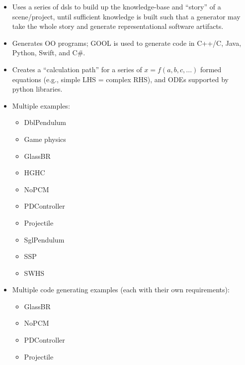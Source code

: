 \begin{itemize}
    \item Uses a series of \acfp{dsl} to build up the knowledge-base and
          ``story'' of a scene/project, until sufficient knowledge is built such that
          a generator may take the whole story and generate representational software
          artifacts.
    \item Generates OO programs; GOOL is used to generate code in C++/C, Java,
          Python, Swift, and C\#.
    \item Creates a ``calculation path'' for a series of $x = f(a,b,c,...)$
          formed equations (e.g., simple LHS = complex RHS), and ODEs supported
          by python libraries.
    \item Multiple examples:
          \begin{itemize}
              \item DblPendulum
              \item Game physics
              \item GlassBR
              \item HGHC
              \item NoPCM
              \item PDController
              \item Projectile
              \item SglPendulum
              \item SSP
              \item SWHS
          \end{itemize}
    \item Multiple code generating examples (each with their own requirements):
          \begin{itemize}
              \item GlassBR
              \item NoPCM
              \item PDController
              \item Projectile
          \end{itemize}
\end{itemize}

